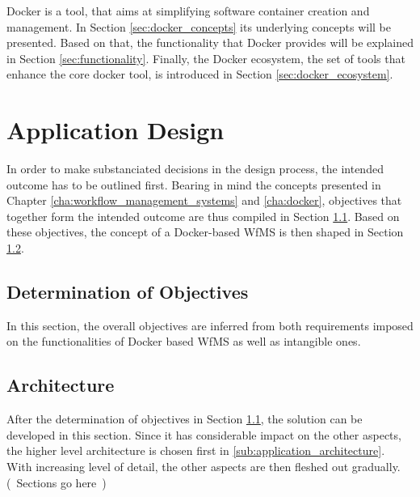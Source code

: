 \documentclass[language=english,noinputenc]{wiwwuwordrprt}
\begin{document}
    Docker is a tool, that aims at simplifying software container creation and management. In Section \ref{sec:docker_concepts} its underlying concepts will be presented. Based on that, the functionality that Docker provides will be explained in Section \ref{sec:functionality}. Finally, the Docker ecosystem, \ie the set of tools that enhance the core docker tool, is introduced in Section \ref{sec:docker_ecosystem}.

    

  \chapter{Application Design} %
    \label{cha:solution_design}

    In order to make substanciated decisions in the design process, the intended outcome has to be outlined first. Bearing in mind the concepts presented in Chapter \ref{cha:workflow_management_systems} and \ref{cha:docker}, objectives that together form the intended outcome are thus compiled in Section \ref{sec:determination_of_objectives}. Based on these objectives, the concept of a Docker-based \ac{WfMS} is then shaped in Section \ref{sec:architecture}.

    \section{Determination of Objectives} %
      \label{sec:determination_of_objectives}

      In this section, the overall objectives are inferred from both requirements imposed on the functionalities of Docker based \ac{WfMS} as well as intangible ones.

      

    \section{Architecture} %
      \label{sec:architecture}

      After the determination of objectives in Section \ref{sec:determination_of_objectives}, the solution can be developed in this section. Since it has considerable impact on the other aspects, the higher level architecture is chosen first in \ref{sub:application_architecture}. With increasing level of detail, the other aspects are then fleshed out gradually. (~Sections go here~)
\end{document}
